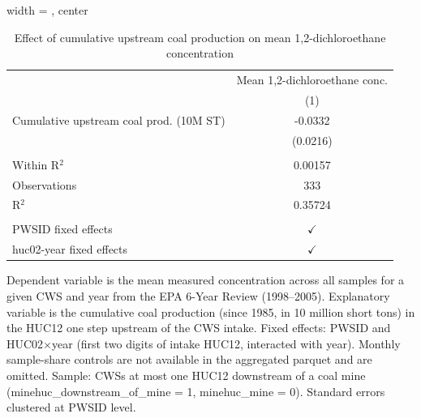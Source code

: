 
\begin{table}[htbp]
   
   \caption{\label{tab:6yr_huc02fe_1_2_dichloroethane_mean} Effect of cumulative upstream coal production on mean 1,2-dichloroethane concentration}
   \bigskip
   
   \centering
   
   \begin{adjustbox}{width = \textwidth, center}
      
      
      \begin{tabular}{lc}
         \toprule
         
                                                 & Mean 1,2-dichloroethane conc.\\  
         
                                                 & (1)\\  
         
         \midrule 
         Cumulative upstream coal prod. (10M ST) & -0.0332\\   
                                                 & (0.0216)\\   
         
          \\
         
         Within R$^2$                            & 0.00157\\  
         Observations                            & 333\\  
         R$^2$                                   & 0.35724\\  
         
          \\
         
         PWSID fixed effects                     & $\checkmark$\\   
         huc02-year fixed effects                & $\checkmark$\\   
         
         \bottomrule
         
      \end{tabular}
      
      
      
   \end{adjustbox}
      {\tiny\linespread{1}\selectfont \par \raggedright 
   Dependent variable is the mean measured concentration across all samples for a given CWS and year from the EPA 6-Year Review (1998--2005). Explanatory variable is the cumulative coal production (since 1985, in 10 million short tons) in the HUC12 one step upstream of the CWS intake. Fixed effects: PWSID and HUC02$\times$year (first two digits of intake HUC12, interacted with year). Monthly sample-share controls are not available in the aggregated parquet and are omitted. Sample: CWSs at most one HUC12 downstream of a coal mine (minehuc\_downstream\_of\_mine = 1, minehuc\_mine = 0). Standard errors clustered at PWSID level.}
   
\end{table}


